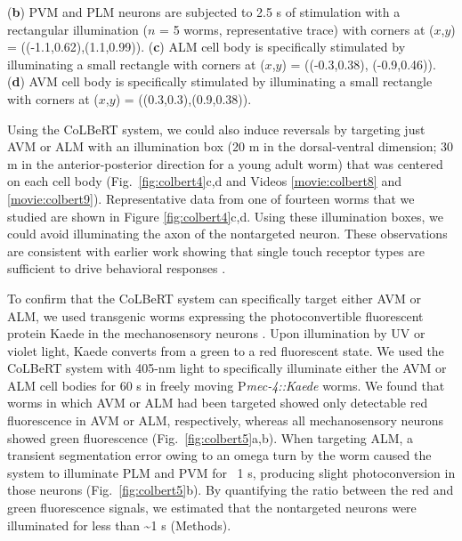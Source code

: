 \begin{FPfigure}
{(\textbf{b}) PVM and PLM neurons are subjected to 2.5 s of stimulation with a rectangular illumination ($n$ = 5 worms, representative trace) with corners at ($x$,$y$) = ((-1.1,0.62),(1.1,0.99)). (\textbf{c}) ALM cell body is specifically stimulated by illuminating a small rectangle with corners at ($x$,$y$) = ((-0.3,0.38), (-0.9,0.46)). 
(\textbf{d}) AVM cell body is specifically stimulated by illuminating a small rectangle with corners at ($x$,$y$) = ((0.3,0.3),(0.9,0.38)).\label{fig:colbert4}}
\end{FPfigure}

Using the CoLBeRT system, we could also induce reversals by targeting just AVM or ALM with an illumination box (20 \textmu m in the dorsal-ventral dimension; 30 \textmu m in the anterior-posterior direction for a young adult worm) that was centered on each cell body (Fig.~\ref{fig:colbert4}c,d and Videos \ref{movie:colbert8} and \ref{movie:colbert9}). Representative data from one of fourteen worms that we studied are shown in Figure \ref{fig:colbert4}c,d. Using these illumination boxes, we could avoid illuminating the axon of the nontargeted neuron. These observations are consistent with earlier work showing that single touch receptor types are sufficient to drive behavioral responses \citep{chalfie_developmental_1981}.

To confirm that the CoLBeRT system can specifically target either AVM or ALM, we used transgenic worms expressing the photoconvertible fluorescent protein Kaede in the mechanosensory neurons \citep{ando_optical_2002}. Upon illumination by UV or violet light, Kaede converts from a green to a red fluorescent state. We used the CoLBeRT  system with 405-nm light to specifically illuminate either the AVM or ALM cell bodies for 60 s in freely moving P\textit{mec-4::Kaede} worms. We found that worms in which AVM or ALM had been targeted showed only detectable red fluorescence in AVM or ALM, respectively, whereas all mechanosensory neurons showed green fluorescence (Fig.~\ref{fig:colbert5}a,b). When targeting ALM, a transient segmentation error owing to an omega turn by the worm caused the system to illuminate PLM and PVM for ~1 s, producing slight photoconversion in those neurons (Fig.~\ref{fig:colbert5}b). By quantifying the ratio between the red and green fluorescence signals, we estimated that the nontargeted neurons were illuminated for less than \textasciitilde1 s (Methods).

